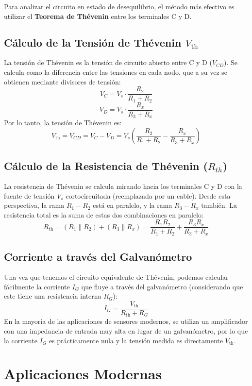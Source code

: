 \documentclass{article}
\begin{document}
Para analizar el circuito en estado de desequilibrio, el método más efectivo es utilizar el \textbf{Teorema de Thévenin} entre los terminales C y D.

\subsection{Cálculo de la Tensión de Thévenin $V_{\mathrm{th}}$}

La tensión de Thévenin es la tensión de circuito abierto entre C y D ($V_{CD}$). Se calcula como la diferencia entre las tensiones en cada nodo, que a su vez se obtienen mediante divisores de tensión:
\[
V_C = V_s \cdot \frac{R_2}{R_1 + R_2}
\]
\[
V_D = V_s \cdot \frac{R_x}{R_3 + R_x}
\]
Por lo tanto, la tensión de Thévenin es:
\[
V_{\mathrm{th}} = V_{CD} = V_C - V_D = V_s \left( \frac{R_2}{R_1 + R_2} - \frac{R_x}{R_3 + R_x} \right)
\]

\subsection{Cálculo de la Resistencia de Thévenin ($R_{th}$)}
La resistencia de Thévenin se calcula mirando hacia los terminales C y D con la fuente de tensión $V_s$ cortocircuitada (reemplazada por un cable). Desde esta perspectiva, la rama $R_1-R_2$ está en paralelo, y la rama $R_3-R_x$ también. La resistencia total es la suma de estas dos combinaciones en paralelo:
\[
R_{\mathrm{th}} = (R_1 \parallel R_2) + (R_3 \parallel R_x) = \frac{R_1 R_2}{R_1 + R_2} + \frac{R_3 R_x}{R_3 + R_x}
\]

\subsection{Corriente a través del Galvanómetro}
Una vez que tenemos el circuito equivalente de Thévenin, podemos calcular fácilmente la corriente $I_G$ que fluye a través del galvanómetro (considerando que este tiene una resistencia interna $R_G$):
\[
I_G = \frac{V_{\mathrm{th}}}{R_{\mathrm{th}} + R_G}
\]
En la mayoría de las aplicaciones de sensores modernos, se utiliza un amplificador con una impedancia de entrada muy alta en lugar de un galvanómetro, por lo que la corriente $I_G$ es prácticamente nula y la tensión medida es directamente $V_{\mathrm{th}}$.


\section{Aplicaciones Modernas}
\end{document}
